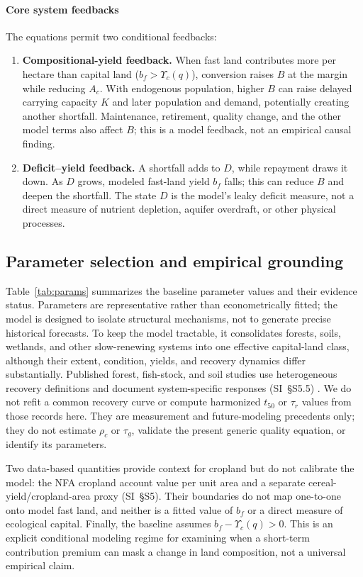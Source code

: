\documentclass[preprint,12pt,authoryear]{elsarticle}
\newcommand{\Ups}{\Upsilon_c}
\begin{document}
\paragraph{Core system feedbacks} The equations permit two conditional feedbacks:
\begin{enumerate}
  \item \textbf{Compositional-yield feedback.} When fast land contributes more per hectare than capital land ($b_f>\Ups(q)$), conversion raises $B$ at the margin while reducing $A_c$. With endogenous population, higher $B$ can raise delayed carrying capacity $K$ and later population and demand, potentially creating another shortfall. Maintenance, retirement, quality change, and the other model terms also affect $B$; this is a model feedback, not an empirical causal finding.
  \item \textbf{Deficit--yield feedback.} A shortfall adds to $D$, while repayment draws it down. As $D$ grows, modeled fast-land yield $b_f$ falls; this can reduce $B$ and deepen the shortfall. The state $D$ is the model's leaky deficit measure, not a direct measure of nutrient depletion, aquifer overdraft, or other physical processes.
\end{enumerate}

\subsection{Parameter selection and empirical grounding}\label{sec:params}

Table~\ref{tab:params} summarizes the baseline parameter values and their evidence status. Parameters are representative rather than econometrically fitted; the model is designed to isolate structural mechanisms, not to generate precise historical forecasts. To keep the model tractable, it consolidates forests, soils, wetlands, and other slow-renewing systems into one effective capital-land class, although their extent, condition, yields, and recovery dynamics differ substantially. Published forest, fish-stock, and soil studies use heterogeneous recovery definitions and document system-specific responses (SI~\S S5.5) \citep{Poorter2016,HutchingsReynolds2004,Neubauer2013,Poeplau2011}. We do not refit a common recovery curve or compute harmonized $t_{50}$ or $\tau_r$ values from those records here. They are measurement and future-modeling precedents only; they do not estimate $\rho_c$ or $\tau_g$, validate the present generic quality equation, or identify its parameters.

Two data-based quantities provide context for cropland but do not calibrate the model: the NFA cropland account value per unit area and a separate cereal-yield/cropland-area proxy (SI~\S S5). Their boundaries do not map one-to-one onto model fast land, and neither is a fitted value of $b_f$ or a direct measure of ecological capital. Finally, the baseline assumes $b_f-\Ups(q)>0$. This is an explicit conditional modeling regime for examining when a short-term contribution premium can mask a change in land composition, not a universal empirical claim.
\end{document}
